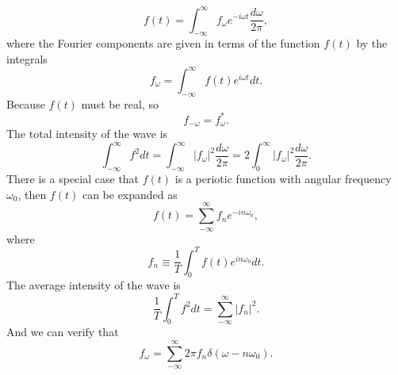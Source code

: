 \[f(t) = \int_{-\infty}^{\infty} f_{\omega}e^{-i\omega t} \frac{d\omega}{2\pi},\]
where the Fourier components are given in terms of the function $f(t)$ by the integrals
\[f_{\omega} = \int_{-\infty}^{\infty} f(t)e^{i\omega t} dt.\]
Because $f(t)$ must be real, so
\[f_{-\omega} = f_{\omega}^{*}.\]
The total intensity of the wave is
\[\int_{-\infty}^{\infty} f^2 dt = \int_{-\infty}^{\infty} |f_{\omega}|^2 \frac{d\omega}{2\pi} = 2\int_{0}^{\infty} |f_{\omega}|^2 \frac{d\omega}{2\pi} .\]
There is a special case that $f(t)$ is a periotic function with angular frequency $\omega_0$, then $f(t)$ can be expanded as
\[f(t) = \sum_{-\infty}^{\infty} f_n e^{-in\omega_0},\]
where
\[f_n \equiv \frac{1}{T} \int_{0}^{T} f(t)e^{in\omega_0} dt.\]
The average intensity of the wave is
\[\frac{1}{T}\int_{0}^{T} f^2 dt = \sum_{-\infty}^{\infty} |f_n|^2.\]
And we can verify that
\[f_{\omega} = \sum_{-\infty}^{\infty} 2\pi f_n \delta(\omega-n\omega_0).\]

